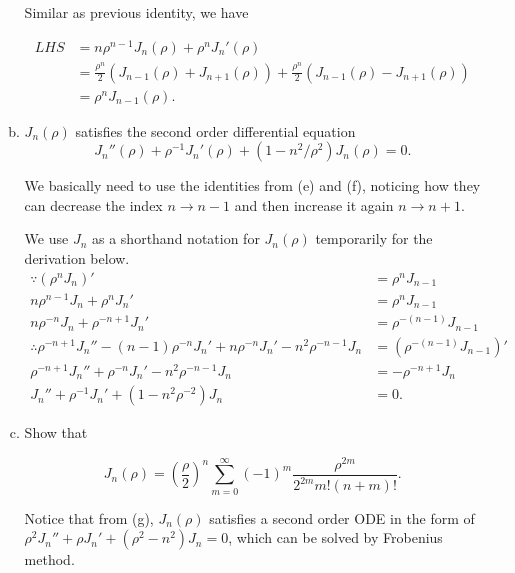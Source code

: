 \documentclass{article}
\begin{document}
\begin{enumerate}
\begin{enumerate}[(a)]
        \begin{solution}
            Similar as previous identity, we have 

            \begin{align*}
                LHS &= n\rho^{n-1} J_n(\rho) + \rho^n J_n'(\rho) \\
                &= \frac{\rho^n}2(J_{n-1}(\rho) + J_{n+1}(\rho)) + \frac{\rho^n}2(J_{n-1}(\rho) - J_{n+1}(\rho)) \\
                &= \rho^n J_{n-1}(\rho).
            \end{align*}
        \end{solution}

        \item $J_n(\rho)$ satisfies the second order differential equation
        $$J_n''(\rho) + \rho^{-1}J_n'(\rho) + (1-n^2/\rho^2)J_n(\rho) = 0.$$

        \begin{solution}
            We basically need to use the identities from (e) and (f), noticing how they can decrease the index $n\to n-1$ and then 
            increase it again $n\to n+1$. 

            We use $J_n$ as a shorthand notation for $J_n(\rho)$ temporarily for the derivation below.
            \begin{align*}
                \because (\rho^n J_n)' &= \rho^n J_{n-1} \\
                n\rho^{n-1} J_n + \rho^n J_n' &= \rho^n J_{n-1} \\
                n\rho^{-n}J_n + \rho^{-n+1}J_n' &= \rho^{-(n-1)}J_{n-1} \\
                \therefore \rho^{-n+1}J_n''-(n-1)\rho^{-n}J_n'+n\rho^{-n}J_n'-n^2\rho^{-n-1}J_n&=(\rho^{-(n-1)} J_{n-1})'\\
                \rho^{-n+1}J_n'' + \rho^{-n}J_n' - n^2\rho^{-n-1} J_n &= -\rho^{-n+1}J_n\\
                J_n'' + \rho^{-1}J_n' + (1-n^2\rho^{-2}) J_n&=0.
            \end{align*}
        \end{solution}

        \item Show that 
        
        \begin{solution}
            $$J_n(\rho) = \left(\dfrac\rho2\right)^n \sum_{m=0}^\infty (-1)^m \dfrac{\rho^{2m}}{2^{2m}m!(n+m)!}.$$

            Notice that from (g), $J_n(\rho)$ satisfies a second order ODE in the form of $\rho^2 J_n'' + \rho J_n' + (\rho^2-n^2)J_n=0$, 
            which can be solved by Frobenius method. 


\end{solution}
\end{enumerate}
\end{enumerate}
\end{document}
